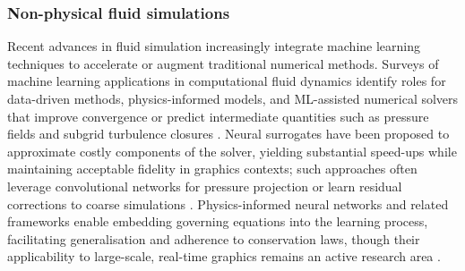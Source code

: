 

\subsubsection{Non-physical fluid simulations}

Recent advances in fluid simulation increasingly integrate machine learning techniques to accelerate or augment traditional numerical methods. Surveys of machine learning applications in computational fluid dynamics identify roles for data-driven methods, physics-informed models, and ML-assisted numerical solvers that improve convergence or predict intermediate quantities such as pressure fields and subgrid turbulence closures \cite{Huang2022NN}. Neural surrogates have been proposed to approximate costly components of the solver, yielding substantial speed-ups while maintaining acceptable fidelity in graphics contexts; such approaches often leverage convolutional networks for pressure projection or learn residual corrections to coarse simulations \cite{Tompson2017,Sousa2024}. Physics-informed neural networks and related frameworks enable embedding governing equations into the learning process, facilitating generalisation and adherence to conservation laws, though their applicability to large-scale, real-time graphics remains an active research area \cite{Brunton2025}.

